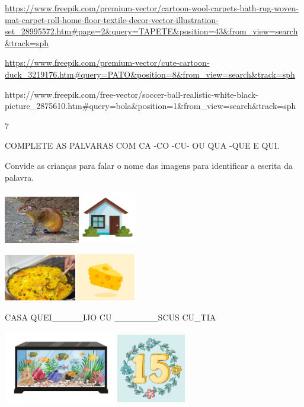 {\url{https://www.freepik.com/premium-vector/cartoon-wool-carpets-bath-rug-woven-mat-carpet-roll-home-floor-textile-decor-vector-illustration-set_28995572.htm\#page=2\&query=TAPETE\&position=43\&from_view=search\&track=sph}

\url{https://www.freepik.com/premium-vector/cute-cartoon-duck_3219176.htm\#query=PATO\&position=8\&from_view=search\&track=sph}

https://www.freepik.com/free-vector/soccer-ball-realistic-white-black-picture\_2875610.htm\#query=bola\&position=1\&from\_view=search\&track=sph

\num{7}

COMPLETE AS PALVARAS COM CA -CO -CU- OU QUA -QUE E QUI.

Convide as crianças para falar o nome das imagens para identificar a
escrita da palavra.

\includegraphics[width=1.30278in,height=0.81667in]{media/image26.jpeg}\includegraphics[width=1.00903in,height=0.90972in]{media/image27.jpeg}

\includegraphics[width=1.24028in,height=0.81042in]{media/image28.jpeg}\includegraphics[width=1.05556in,height=0.81667in]{media/image29.jpeg}

CASA QUEI\_\_\_\_\_IJO CU \_\_\_\_\_\_\_SCUS CU\_TIA

\includegraphics[width=1.98343in,height=1.24038in]{media/image30.jpeg}\includegraphics[width=1.18269in,height=1.18269in]{media/image31.jpeg}

}

